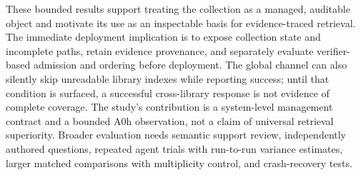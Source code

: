 These bounded results support treating the collection as a managed, auditable
object and motivate its use as an inspectable basis for evidence-traced
retrieval. The immediate deployment implication is to expose collection state
and incomplete paths, retain evidence provenance, and separately evaluate
verifier-based admission and ordering before deployment. The global channel can also
silently skip unreadable library indexes while reporting success; until that
condition is surfaced, a successful cross-library response is not evidence of
complete coverage. The study's contribution is a system-level management
contract and a bounded A0h observation, not a claim of universal retrieval
superiority. Broader evaluation needs semantic support review, independently
authored questions, repeated agent trials with run-to-run variance estimates,
larger matched comparisons with multiplicity control, and crash-recovery tests.

